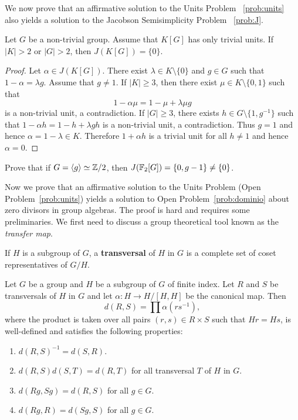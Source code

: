 We now prove that an affirmative solution to the Units Problem
~\ref{prob:units} also yields a solution to the Jacobson Semisimplicity Problem
~\ref{prob:J}. 

\begin{theorem}
	Let $G$ be a non-trivial group. Assume that $K[G]$ has only trivial units. 
	If $|K|>2$ or $|G|>2$, then $J(K[G])=\{0\}$.
\end{theorem}

\begin{proof}
	Let $\alpha\in J(K[G])$. There exist $\lambda\in K\setminus\{0\}$ and $g\in
	G$ such that $1-\alpha=\lambda g$. Assume that $g\ne 1$.  If $|K|\geq3$,
	then there exist $\mu\in K\setminus\{0,1\}$ such that
	\[
		1-\alpha\mu=1-\mu+\lambda\mu g 
	\]
	is a non-trivial unit, a contradiction.
	If $|G|\geq3$, there exists $h\in G\setminus\{1,g^{-1}\}$ such that
	$1-\alpha h=1-h+\lambda gh$ is a non-trivial unit, a contradiction.  Thus
	$g=1$ and hence $\alpha=1-\lambda\in K$. Therefore $1+\alpha h$ is a
	trivial unit for all $h\ne 1$ and hence 	$\alpha=0$.
\end{proof}

\begin{exercise}
	Prove that if $G=\langle g\rangle\simeq\mathbb{Z}/2$, then 
	$J(\mathbb{F}_2[G])=\{0,g-1\}\ne\{0\}$. 
\end{exercise}


Now we prove that an affirmative solution 
to the Units Problem 
(Open Problem~\ref{prob:units}) 
yields a solution to 
Open Problem~\ref{prob:dominio} about zero divisors in group algebras.
The proof is hard and requires some preliminaries. We first need
to discuss a group theoretical tool known as the \emph{transfer map}. 

If $H$ is a subgroup of $G$, a \textbf{transversal} of $H$ in $G$ is a complete
set of coset representatives of $G/H$. 

\begin{lemma}
	\label{lem:d}
	Let $G$ be a group and $H$ be a subgroup of $G$ of finite index.  Let $R$
	and $S$ be transversals of $H$ in $G$ and let $\alpha\colon H\to H/[H,H]$
	be the canonical map. Then 
	\[
		d(R,S)=\prod \alpha(rs^{-1}),
	\]
	where the product is taken over all pairs 
	$(r,s)\in R\times S$ such that $Hr=Hs$,
	is well-defined and satisfies the following properties:
	\begin{enumerate}
		\item $d(R,S)^{-1}=d(S,R)$.
		\item $d(R,S)d(S,T)=d(R,T)$ for all transversal $T$ of $H$ in $G$.
		\item $d(Rg,Sg)=d(R,S)$ for all $g\in G$.
		\item $d(Rg,R)=d(Sg,S)$ for all $g\in G$.
	\end{enumerate}
\end{lemma}


